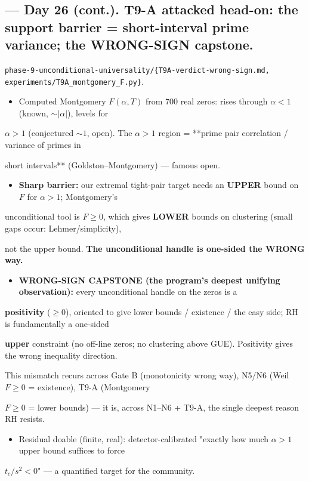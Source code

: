 \documentclass[10pt]{article}
\begin{document}
\subsection*{ --- Day 26 (cont.). T9-A attacked head-on: the support barrier = short-interval prime variance; the WRONG-SIGN capstone.}
\texttt{phase-9-unconditional-universality/\{T9A-verdict-wrong-sign.md, experiments/T9A\_montgomery\_F.py\}}.\par
\begin{itemize}
\item Computed Montgomery $F(\alpha,T)$ from 700 real zeros: rises through $\alpha<1$ (known, $\sim|\alpha|$), levels for
\end{itemize}
  $\alpha>1$ (conjectured $\sim1$, open). The $\alpha>1$ region = **prime pair correlation / variance of primes in\par
  short intervals** (Goldston--Montgomery) --- famous open.\par
\begin{itemize}
\item \textbf{Sharp barrier:} our extremal tight-pair target needs an \textbf{UPPER} bound on $F$ for $\alpha>1$; Montgomery's
\end{itemize}
  unconditional tool is $F\ge0$, which gives \textbf{LOWER} bounds on clustering (small gaps occur: Lehmer/simplicity),\par
  not the upper bound. \textbf{The unconditional handle is one-sided the WRONG way.}\par
\begin{itemize}
\item \textbf{WRONG-SIGN CAPSTONE (the program's deepest unifying observation):} every unconditional handle on the zeros is a
\end{itemize}
  \textbf{positivity} ($\ge0$), oriented to give lower bounds / existence / the easy side; RH is fundamentally a one-sided\par
  \textbf{upper} constraint (no off-line zeros; no clustering above GUE). Positivity gives the wrong inequality direction.\par
  This mismatch recurs across Gate B (monotonicity wrong way), N5/N6 (Weil $F\ge0$ = existence), T9-A (Montgomery\par
  $F\ge0$ = lower bounds) --- it is, across N1--N6 + T9-A, the single deepest reason RH resists.\par
\begin{itemize}
\item Residual doable (finite, real): detector-calibrated "exactly how much $\alpha>1$ upper bound suffices to force
\end{itemize}
  $t_c/s^2<0$" --- a quantified target for the community.\par
\end{document}
